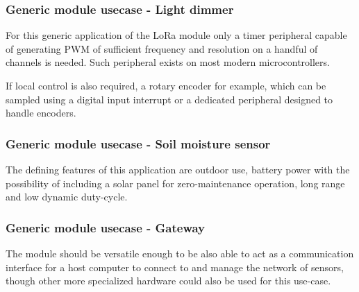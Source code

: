 \subsubsection{Generic module usecase - Light dimmer}
For this generic application of the LoRa module only a timer peripheral capable of generating PWM of sufficient frequency and resolution on a handful of channels is needed. Such peripheral exists on most modern microcontrollers.

If local control is also required, a rotary encoder for example, which can be sampled using a digital input interrupt or a dedicated peripheral designed to handle encoders.

\subsubsection{Generic module usecase - Soil moisture sensor}
The defining features of this application are outdoor use, battery power with the possibility of including a solar panel for zero-maintenance operation, long range and low dynamic duty-cycle.

\subsubsection{Generic module usecase - Gateway}
The module should be versatile enough to be also able to act as a communication interface for a host computer to connect to and manage the network of sensors, though other more specialized hardware could also be used for this use-case.

